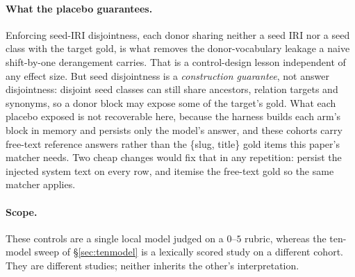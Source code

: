 \documentclass[10pt,twocolumn]{article}
\begin{document}
\paragraph{What the placebo guarantees.} Enforcing seed-IRI disjointness, each donor sharing neither a seed IRI nor a seed class with the target gold, is what removes the donor-vocabulary leakage a naive shift-by-one derangement carries. That is a control-design lesson independent of any effect size. But seed disjointness is a \emph{construction guarantee}, not answer disjointness: disjoint seed classes can still share ancestors, relation targets and synonyms, so a donor block may expose some of the target's gold. What each placebo exposed is not recoverable here, because the harness builds each arm's block in memory and persists only the model's answer, and these cohorts carry free-text reference answers rather than the \{slug, title\} gold items this paper's matcher needs. Two cheap changes would fix that in any repetition: persist the injected system text on every row, and itemise the free-text gold so the same matcher applies.

\paragraph{Scope.} These controls are a single local model judged on a $0$--$5$ rubric, whereas the ten-model sweep of \S\ref{sec:tenmodel} is a lexically scored study on a different cohort. They are different studies; neither inherits the other's interpretation.
\end{document}
